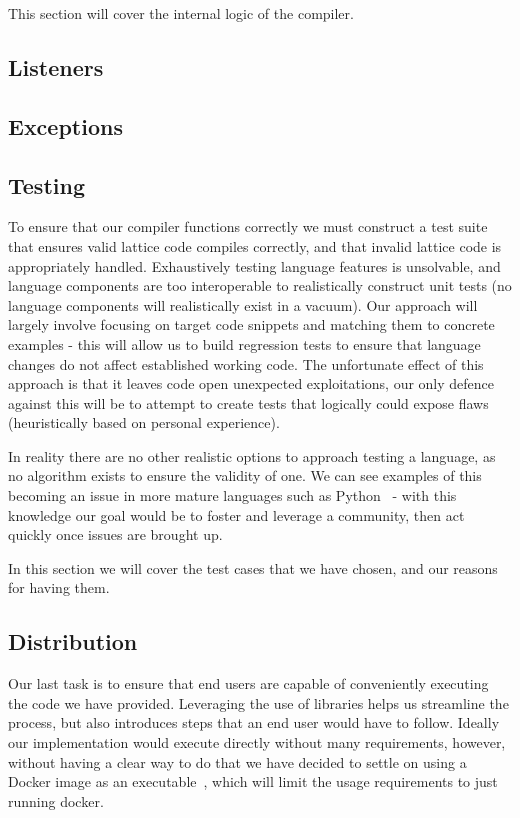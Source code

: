 This section will cover the internal logic of the compiler.

\subsection{Listeners}

\subsection{Exceptions}

\subsection{Testing}
To ensure that our compiler functions correctly we must construct a test suite that ensures valid lattice code compiles
correctly, and that invalid lattice code is appropriately handled.
Exhaustively testing language features is unsolvable, and language components are too interoperable to realistically
construct unit tests (no language components will realistically exist in a vacuum).
Our approach will largely involve focusing on target code snippets and matching them to concrete examples - this will
allow us to build regression tests to ensure that language changes do not affect established working code.
The unfortunate effect of this approach is that it leaves code open unexpected exploitations, our only defence against
this will be to attempt to create tests that logically could expose flaws (heuristically based on personal experience).

In reality there are no other realistic options to approach testing a language, as no algorithm exists to ensure the
validity of one.
We can see examples of this becoming an issue in more mature languages such as Python~\cite{PythonIssue} - with this
knowledge our goal would be to foster and leverage a community, then act quickly once issues are brought up.

In this section we will cover the test cases that we have chosen, and our reasons for having them.

\subsection{Distribution}
Our last task is to ensure that end users are capable of conveniently executing the code we have provided.
Leveraging the use of libraries helps us streamline the process, but also introduces steps that an end user would have
to follow.
Ideally our implementation would execute directly without many requirements, however, without having a clear way to do
that we have decided to settle on using a Docker image as an executable~\cite{DockerExec}, which will limit the usage
requirements to just running docker.


